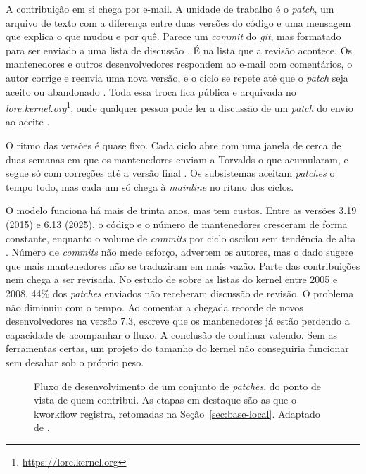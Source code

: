 A contribuição em si chega por e-mail. A unidade de trabalho é o
\textit{patch}, um arquivo de texto com a diferença entre duas versões do
código e uma mensagem que explica o que mudou e por quê. Parece um
\textit{commit} do \textit{git}, mas formatado para ser enviado a uma lista de
discussão \citep{tadokoro2025sustain}. É na lista que a revisão acontece. Os
mantenedores e outros desenvolvedores respondem ao e-mail com comentários, o
autor corrige e reenvia uma nova versão, e o ciclo se repete até que o
\textit{patch} seja aceito ou abandonado \citep{kerneldocprocess}. Toda essa
troca fica pública e arquivada no
\textit{lore.kernel.org}\footnote{\url{https://lore.kernel.org}}, onde
qualquer pessoa pode ler a discussão de um \textit{patch} do envio ao aceite
\citep{lorekernel, tadokoro2023lore}.

O ritmo das versões é quase fixo. Cada ciclo abre com uma janela de cerca de
duas semanas em que os mantenedores enviam a Torvalds o que acumularam, e
segue só com correções até a versão final \citep{kerneldocprocess}. Os
subsistemas aceitam \textit{patches} o tempo todo, mas cada um só chega à
\textit{mainline} no ritmo dos ciclos.

O modelo funciona há mais de trinta anos, mas tem custos. Entre as versões
3.19 (2015) e 6.13 (2025), o código e o número de mantenedores cresceram de
forma constante, enquanto o volume de \textit{commits} por ciclo oscilou sem
tendência de alta \citep{tadokoro2025sustain}. Número de \textit{commits} não
mede esforço, advertem os autores, mas o dado sugere que mais mantenedores não
se traduziram em mais vazão. Parte das contribuições nem chega a ser revisada.
No estudo de \citet{rigby2014peer} sobre as listas do kernel entre 2005 e
2008, 44\% dos \textit{patches} enviados não receberam discussão de revisão. O
problema não diminuiu com o tempo. Ao comentar a chegada recorde de novos
desenvolvedores na versão 7.3, \citet{corbet2026stats73} escreve que os
mantenedores já estão perdendo a capacidade de acompanhar o fluxo. A conclusão
de \citet{corbet2017lfreport} continua valendo. Sem as ferramentas certas, um
projeto do tamanho do kernel não conseguiria funcionar sem desabar sob o
próprio peso.

\begin{figure}[htbp]
  \centering
  \resizebox{\textwidth}{!}{}
  \caption{Fluxo de desenvolvimento de um conjunto de \textit{patches}, do
    ponto de vista de quem contribui. As etapas em destaque são as que o
    kworkflow registra, retomadas na Seção~\ref{sec:base-local}. Adaptado de
    \citet{tadokoro2025kw}.}
  \label{fig:fluxo-patchset}
\end{figure}

